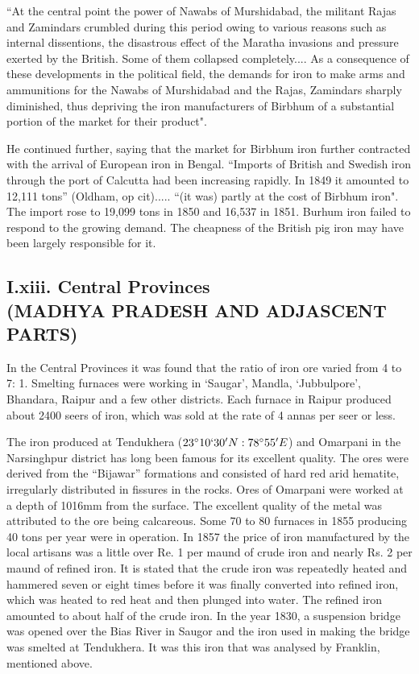 
\footnotesize{``At the central point the power of Nawabs of Murshidabad, the militant Rajas and Zamindars crumbled during this period owing to various reasons such as internal dissentions, the disastrous effect of the Maratha invasions and pressure exerted by the British.  Some of them collapsed completely.... As a consequence of these developments in the political field, the demands for iron to make arms and ammunitions for the Nawabs of Murshidabad and the Rajas, Zamindars sharply diminished, thus depriving the iron manufacturers of Birbhum of a substantial portion of the market for their product".}  

He continued further, saying that the market for Birbhum iron further contracted with the arrival of European iron in Bengal.  “Imports of British and Swedish iron through the port of Calcutta had been increasing rapidly.  In 1849 it amounted to 12,111 tons” (Oldham, op cit)..... “(it was) partly at the cost of Birbhum iron".  The import rose to 19,099 tons in 1850 and 16,537 in 1851.  Burhum iron failed to respond to the growing demand.  The cheapness of the British pig iron may have been largely responsible for it.

\vspace{-.3cm}

\subsection*{I.xiii.  Central Provinces\\ (MADHYA PRADESH AND ADJASCENT PARTS)}\label{subsection-13}

\vspace{-.2cm}

In the Central Provinces it was found that the ratio of iron ore varied from 4 to 7: 1. Smelting furnaces were working in ‘Saugar’, Mandla, `Jubbulpore', Bhandara, Raipur and a few other districts. Each furnace in Raipur produced about 2400 seers of iron, which was sold at the rate of 4 annas per seer or less. 

The iron produced at Tendukhera ($23^\circ 10` 30'N: 78^\circ 55'E$) and Omar\-pani in the Narsinghpur district has long been famous for its excellent quality. The ores were derived from the “Bijawar” formations and consisted of hard red arid hematite, irregularly distributed in fissures in the rocks. Ores of Omarpani were worked at a depth of 1016mm from the surface. The excellent quality of the metal was attributed to the ore being calcareous. Some 70 to 80 furnaces in 1855 producing 40 tons per year were in operation. In 1857 the price of iron manufac\-tured by the local artisans was a little over Re. 1 per maund of crude iron and nearly Rs. 2 per maund of refined iron. It is stated that the crude iron was repeatedly heated and hammered seven or eight times before it was finally converted into refined iron, which was heated to red heat and then plunged into water. The refined iron amounted to about half of the crude iron. In the year 1830, a suspension bridge was opened over the Bias River in Saugor and the iron used in making the bridge was smelted at Tendukhera. It was this iron that was analysed by Franklin, mentioned above.

